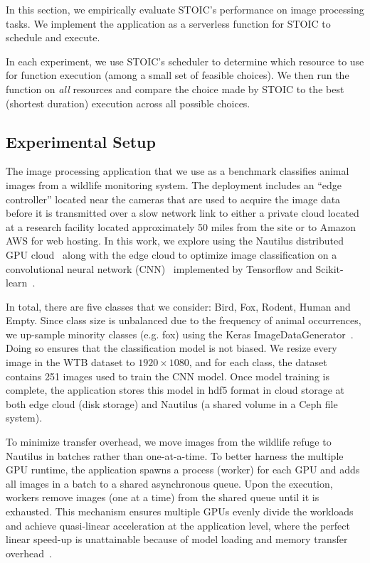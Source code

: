 In this section, we empirically evaluate STOIC's performance on image
processing tasks. We implement the application as a serverless function for
STOIC to schedule and execute.

In each experiment, we use STOIC's scheduler to determine which resource to
use for function execution (among a small set of feasible choices). We then
run the function on \textit{all} resources and compare the choice made by
STOIC to the best (shortest duration) execution across all possible choices.

\subsection{Experimental Setup}

The image processing application that we use as a benchmark classifies animal
images from a wildlife monitoring system.
The 
deployment includes an ``edge controller'' located near the cameras that are
used to acquire the image data before it is transmitted over a slow network
link to either a private cloud located at a research facility located
approximately 50 miles from the site or to Amazon AWS for web
hosting. In this work, we explore using the Nautilus distributed GPU
cloud~\cite{ref:nautilus} along with the edge cloud to optimize image
classification on a convolutional neural network (CNN)~\cite{ref:cnn}
implemented by Tensorflow and Scikit-learn~\cite{ref:scikit}. 

In total, there are five classes that we consider: Bird, Fox, Rodent, Human
and Empty. Since class size is unbalanced due to the frequency of animal
occurrences, we up-sample minority classes (e.g. fox) using the Keras
ImageDataGenerator~\cite{ref:keras}. Doing so ensures that the classification
model is not biased. We resize every image in the WTB dataset to $1920 \times
1080$, and for each class, the dataset contains 251 images used to train the
CNN model. Once model training is complete, the application stores this model
in hdf5 format in cloud storage at both edge cloud (disk storage) and Nautilus
(a shared volume in a Ceph file system). 

To minimize transfer overhead, we move images from 
the wildlife refuge
to Nautilus in
batches rather than one-at-a-time. To better harness the multiple GPU runtime,
the application spawns a process (worker) for each GPU and adds all images in
a batch to a shared asynchronous queue. Upon the execution, workers remove
images (one at a time) from the shared queue until it is exhausted. This
mechanism ensures multiple GPUs evenly divide the workloads and achieve
quasi-linear acceleration at the application level, where the perfect linear
speed-up is unattainable because of model loading and memory transfer
overhead~\cite{ref:multi_gpu}. 


